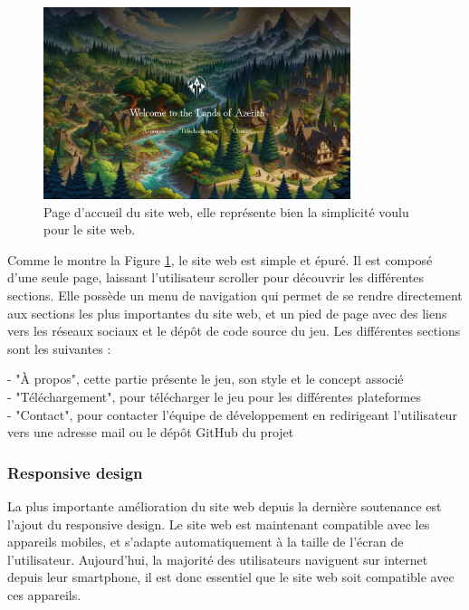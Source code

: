\begin{figure}[H]
    \centering
    \includegraphics[width=0.8\textwidth]{assets/website1.png}
    \caption{Page d'accueil du site web, elle représente bien la simplicité voulu pour le site web.}
    \label{fig:website1}
\end{figure}

Comme le montre la Figure \ref*{fig:website1}, le site web est simple et épuré.
Il est composé d'une seule page, laissant l'utilisateur scroller pour découvrir les différentes sections.
Elle possède un menu de navigation qui permet de se rendre directement aux sections les plus importantes du site web, et un pied de page avec des liens vers les réseaux sociaux et le dépôt de code source du jeu.
Les différentes sections sont les suivantes :

- "À propos", cette partie présente le jeu, son style et le concept associé
\\

- "Téléchargement", pour télécharger le jeu pour les différentes plateformes
\\

- "Contact", pour contacter l'équipe de développement en redirigeant l'utilisateur vers une adresse mail ou le dépôt GitHub du projet
\\

\subsubsection{Responsive design}

La plus importante amélioration du site web depuis la dernière soutenance est l'ajout du responsive design.
Le site web est maintenant compatible avec les appareils mobiles, et s'adapte automatiquement à la taille de l'écran de l'utilisateur.
Aujourd'hui, la majorité des utilisateurs naviguent sur internet depuis leur smartphone, il est donc essentiel que le site web soit compatible avec ces appareils.

